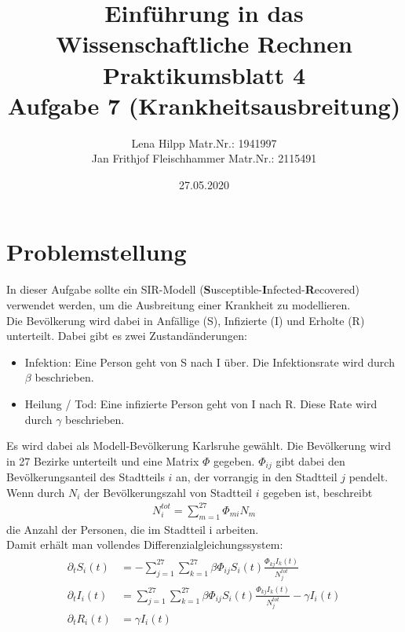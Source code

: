\documentclass[11pt,a4paper]{article}
\title{Einf\"uhrung in das Wissenschaftliche Rechnen\\
  Praktikumsblatt 4\\
  Aufgabe 7 (Krankheitsausbreitung)}
\author{Lena Hilpp Matr.Nr.: 1941997\\Jan Frithjof Fleischhammer Matr.Nr.: 2115491}
\date{27.05.2020}
\begin{document}
  
  \maketitle
  
  \section*{Problemstellung}
  
  In dieser Aufgabe sollte ein SIR-Modell (\textbf{S}usceptible-\textbf{I}nfected-\textbf{R}ecovered) verwendet werden, um die Ausbreitung einer Krankheit zu modellieren.\\
   
  Die Bev\"olkerung wird dabei in Anf\"allige (S), Infizierte (I) und Erholte (R) unterteilt. Dabei gibt es zwei Zustand\"anderungen:
  \begin{itemize}
  \item Infektion: Eine Person geht von S nach I \"uber. Die Infektionsrate wird durch $\beta$ beschrieben.
  \item Heilung / Tod: Eine infizierte Person geht von I nach R. Diese Rate wird durch $\gamma$ beschrieben.
  \end{itemize}
  
  Es wird dabei als Modell-Bev\"olkerung Karlsruhe gew\"ahlt. Die Bev\"olkerung wird in 27 Bezirke unterteilt und eine Matrix $\Phi$ gegeben. $\Phi_{ij}$ gibt dabei den Bev\"olkerungsanteil des Stadtteils $i$ an, der vorrangig in den Stadtteil $j$ pendelt.\\
  
  Wenn durch $N_i$ der Bev\"olkerungszahl von Stadtteil $i$ gegeben ist, beschreibt
  \begin{align*}
  N_i^{tot}=\sum_{m=1}^{27}\Phi_{mi}N_m
  \end{align*}
  die Anzahl der Personen, die im Stadtteil i arbeiten.\\
  Damit erh\"alt man vollendes Differenzialgleichungssystem:
  \begin{align*}
  \begin{split}
  \partial_tS_i(t)&=-\sum_{j=1}^{27}\sum_{k=1}^{27}\beta\Phi_{ij}S_i(t)\frac{\Phi_{kj}I_k(t)}{N_j^{tot}}\\
  \partial_tI_i(t)&=\sum_{j=1}^{27}\sum_{k=1}^{27}\beta\Phi_{ij}S_i(t)\frac{\Phi_{kj}I_k(t)}{N_j^{tot}}-\gamma I_i(t)\\
  \partial_tR_i(t)&=\gamma I_i(t)
  \end{split}
  \end{align*}
  
\end{document}
